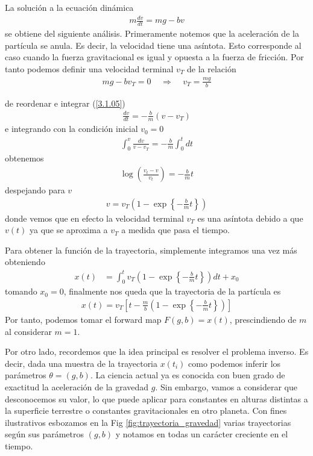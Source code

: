 La solución a la ecuación dinámica
\begin{align}
    m \frac{dv}{dt} = mg - bv
    \label{3.1.05}
\end{align}
se obtiene del siguiente análisis. Primeramente notemos que la aceleración de la partícula se anula. Es decir, la velocidad tiene una asíntota. Esto corresponde al caso cuando la fuerza gravitacional es igual y opuesta a la fuerza de fricción. Por tanto podemos definir una velocidad terminal $v_T$ de la relación
\begin{align}
    mg - bv_T = 0 \:\:\:\:\: \Rightarrow \:\:\:\:\: v_T = \frac{mg}{b}
    \label{3.1.06}
\end{align}

de reordenar e integrar (\ref{3.1.05}) 
\begin{align}
    \frac{dv}{dt } = -\frac{b}{m}(v - v_T)
\end{align}
e integrando con la condición inicial $v_0 = 0$
\begin{align*}
    \int_{0}^{v} \frac{dv}{v - v_T} = -\frac{b}{m} \int_{0}^{t} dt
\end{align*}
obtenemos
\begin{align*}
    \log{\left ( \frac{v_t - v }{v_t} \right )} = -\frac{b}{m}t
\end{align*}
despejando para $v$ 
\begin{align}
    v = v_T \left ( 1- \exp \left \{{-\frac{b}{m}t} \right\} \right ) 
\end{align}
donde vemos que en efecto la velocidad terminal $v_T$ es una asíntota debido a que  $v(t)$ ya que se aproxima a $v_T$ a medida que pasa el tiempo. 

Para obtener la función de la trayectoria, simplemente integramos una vez más obteniendo
\begin{align*}
    x(t) &= \int_{0}^{t} v_T \left ( 1 - \exp \left \{-\frac{b}{m}t \right \} \right ) d t + x_0
\end{align*}
tomando $x_0 = 0$, finalmente nos queda que la trayectoria de la partícula es
\begin{align}
    x(t) = v_T \left [ t - \frac{m}{b} \left( 1- \exp\left\{-\frac{b}{m} t\right \}\right)\right]
\end{align}
Por tanto, podemos tomar el forward map $F(g,b) = x(t)$, prescindiendo de $m$ al considerar $m = 1$.

Por otro lado, recordemos que la idea principal es resolver el problema inverso. Es decir, dada una muestra de la trayectoria $x(t_i)$ como podemos inferir los parámetros $\theta = (g,b)$. La ciencia actual ya es conocida con buen grado de exactitud la aceleración de la gravedad $g$. Sin embargo, vamos a considerar que desconocemos su valor, lo que puede aplicar para constantes en alturas distintas a la superficie terrestre o constantes gravitacionales en otro planeta. Con fines ilustrativos esbozamos en la Fig \ref{fig:trayectoria_gravedad} varias trayectorias según sus parámetros $(g,b)$ y notamos en todas un carácter creciente en el tiempo.

